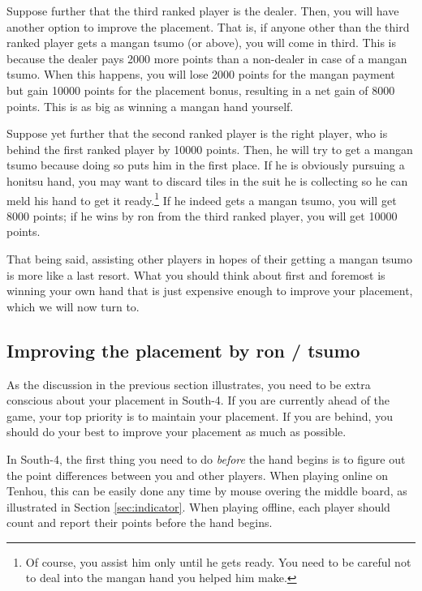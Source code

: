 \bigskip
Suppose further that the third ranked player is the dealer. Then, you will have another option to improve the placement. That is, if anyone other than the third ranked player gets a {\jap mangan tsumo} (or above), you will come in third. This is because the dealer pays 2000 more points than a non-dealer in case of a {\jap mangan tsumo}. When this happens, you will lose 2000 points for the {\jap mangan} payment but gain 10000 points for the placement bonus, resulting in a net gain of 8000 points. This is as big as winning a {\jap mangan} hand yourself.

\bigskip
Suppose yet further that the second ranked player is the right player, who is behind the first ranked player by 10000 points. Then, he will try to get a {\jap mangan tsumo} because doing so puts him in the first place. If he is obviously pursuing a {\jap honitsu} hand, you may want to discard tiles in the suit he is collecting so he can meld his hand to get it ready.\footnote{Of course, you assist him only until he gets ready. You need to be careful not to deal into the {\jap mangan} hand you helped him make.} If he indeed gets a {\jap mangan tsumo}, you will get 8000 points; if he wins by {\jap ron} from the third ranked player, you will get 10000 points. 

\bigskip
That being said, assisting other players in hopes of their getting a {\jap mangan tsumo} is more like a last resort. What you should think about first and foremost is winning your own hand that is just expensive enough to improve your placement, which we will now turn to.

\subsection*{Improving the placement by {\jap ron} / {\jap tsumo}}
As the discussion in the previous section illustrates, you need to be extra conscious about your placement in South-4. If you are currently ahead of the game, your top priority is to maintain your placement. If you are behind, you should do your best to improve your placement as much as possible. 

\bigskip
In South-4, the first thing you need to do \emph{before} the hand begins is to figure out the point differences between you and other players. When playing online on {\jap Tenhou}, this can be easily done any time by mouse overing the middle board, as illustrated in Section \ref{sec:indicator}. When playing offline, each player should count and report their points before the hand begins. 

